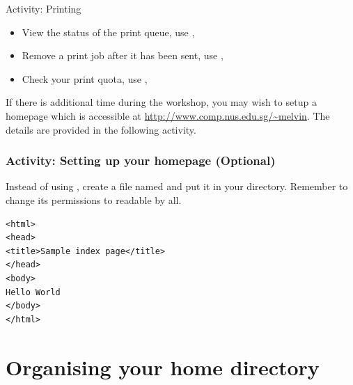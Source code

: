 \begin{frame}{Activity: Printing}

\begin{itemize}
\item View the status of the print queue, use , 
\item Remove a print job after it has been sent, use , 
\item Check your print quota, use , 
\end{itemize}

\end{frame}

If there is additional time during the workshop, you may wish to setup a
homepage which is accessible at \url{http://www.comp.nus.edu.sg/~melvin}.
The details are provided in the following activity.  

\begin{frame}[fragile]
\frametitle{Activity: Setting up your homepage (Optional)}
Instead of using , create a file named  and
put it in your  directory. Remember to change its
permissions to readable by all.  

\begin{verbatim}
<html>
<head>
<title>Sample index page</title>
</head>
<body>
Hello World
</body>
</html>
\end{verbatim}
\end{frame}

\section{Organising your home directory}

